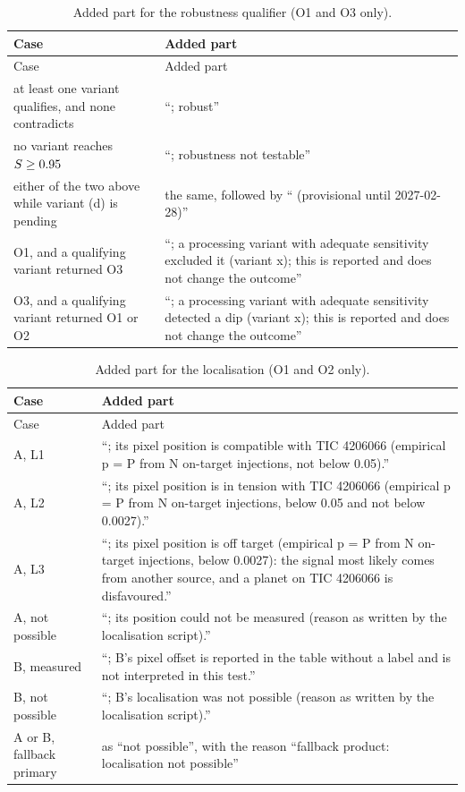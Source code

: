 \begin{longtable}{>{\raggedright\arraybackslash}p{}>{\raggedright\arraybackslash}p{}}
\caption{Added part for the robustness qualifier (O1 and O3 only).\label{tab:sent2}}\\
\toprule
Case & Added part \\
\midrule
\endfirsthead
\toprule
Case & Added part \\
\midrule
\endhead
at least one variant qualifies, and none contradicts & ``; robust'' \\
no variant reaches $S \geq 0.95$ & ``; robustness not testable'' \\
either of the two above while variant (d) is pending & the same, followed by `` (provisional until 2027-02-28)'' \\
O1, and a qualifying variant returned O3 & ``; a processing variant with adequate sensitivity excluded it (variant x);
  this is reported and does not change the outcome'' \\
O3, and a qualifying variant returned O1 or O2 & ``; a processing variant with adequate sensitivity detected a dip
  (variant x); this is reported and does not change the outcome'' \\
\bottomrule
\end{longtable}

\begin{longtable}{>{\raggedright\arraybackslash}p{}>{\raggedright\arraybackslash}p{}}
\caption{Added part for the localisation (O1 and O2 only).\label{tab:sent3}}\\
\toprule
Case & Added part \\
\midrule
\endfirsthead
\toprule
Case & Added part \\
\midrule
\endhead
A, L1 & ``; its pixel position is compatible with TIC 4206066 (empirical p = P from N on-target injections, not below
  0.05).'' \\
A, L2 & ``; its pixel position is in tension with TIC 4206066 (empirical p = P from N on-target injections, below 0.05
  and not below 0.0027).'' \\
A, L3 & ``; its pixel position is off target (empirical p = P from N on-target injections, below 0.0027): the signal
  most likely comes from another source, and a planet on TIC 4206066 is disfavoured.'' \\
A, not possible & ``; its position could not be measured (reason as written by the localisation script).'' \\
B, measured & ``; B's pixel offset is reported in the table without a label and is not interpreted in this test.'' \\
B, not possible & ``; B's localisation was not possible (reason as written by the localisation script).'' \\
A or B, fallback primary & as ``not possible'', with the reason ``fallback product: localisation not possible'' \\
\bottomrule
\end{longtable}

